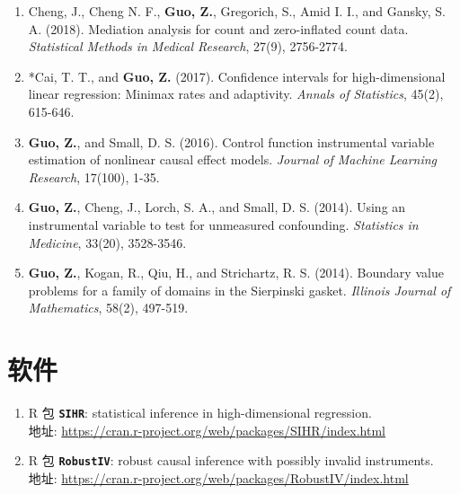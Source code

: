 \documentclass[margin, line]{res}
\begin{document}
\begin{resume}
\begin{enumerate}
			\item Cheng, J., Cheng N. F., {\bf Guo, Z.}, Gregorich, S., Amid I. I.,
				and Gansky, S. A. (2018). Mediation analysis for count and zero-inflated
				count data. {\it Statistical Methods in Medical Research}, 27(9), 2756-2774. %

			\item {*}Cai, T. T., and {\bf Guo, Z.} (2017). Confidence intervals for high-dimensional
				linear regression: Minimax rates and adaptivity. {\it Annals of Statistics},
				45(2), 615-646. %

			\item {\bf Guo, Z.}, and Small, D. S. (2016). Control function
				instrumental variable estimation of nonlinear causal effect models. {\it Journal of Machine Learning Research},
				17(100), 1-35. %

			\item {\bf Guo, Z.}, Cheng, J., Lorch, S. A., and Small, D. S. (2014). Using
				an instrumental variable to test for unmeasured confounding.
				{\it Statistics in Medicine}, 33(20), 3528-3546. %

			\item {\bf Guo, Z.}, Kogan, R., Qiu, H., and Strichartz, R. S. (2014).
				Boundary value problems for a family of domains in the Sierpinski gasket.
				{\it Illinois Journal of Mathematics}, 58(2), 497-519. %
		\end{enumerate}

		\section{\sc 软件}
		\begin{enumerate}
            \setlength{\itemsep}{3pt}

            \item {R 包} \texttt{\bf SIHR}: statistical inference in high-dimensional
                regression. \\ 地址: \url{https://cran.r-project.org/web/packages/SIHR/index.html}

            \item {R 包} \texttt{\bf RobustIV}: robust causal inference with possibly
                invalid instruments. \\ 地址: \url{https://cran.r-project.org/web/packages/RobustIV/index.html}


\end{enumerate}
\end{resume}
\end{document}
